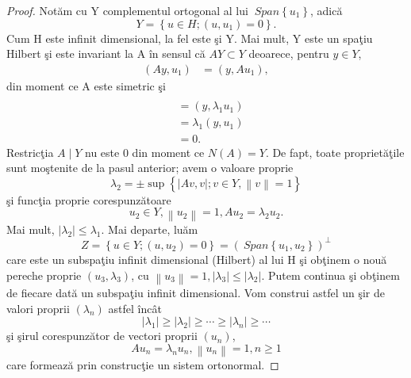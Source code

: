 \documentclass[a4paper,12pt,oneside]{report}
\begin{document}
\begin{proof}
Not\u{a}m cu Y complementul ortogonal al lui \(\ Span \left \{ u_{1} \right \}\), adic\u{a}
\begin{displaymath}
  Y = \left \{ u \in H; \left ( u,u_{1} \right ) = 0  \right \}.
\end{displaymath}
Cum H este infinit dimensional, la fel este \c{s}i Y. Mai mult, Y este un spa\c{t}iu Hilbert \c{s}i este invariant la A \^{i}n sensul c\u{a} \(AY \subset Y\) deoarece, pentru \( y\in Y\),
\begin{equation} \nonumber
    \begin{split}
        \left ( Ay, u_{1} \right ) &  = \left ( y,Au_{1} \right ),
    \end{split}
\end{equation}
din moment ce A este simetric \c{s}i
\begin{equation} \nonumber
\begin{split}
    \\ & = \left ( y,\lambda _{1}u_{1} \right ) \\ & = \lambda _{1}\left ( y,u_{1} \right ) \\ & = 0.
\end{split}
\end{equation}
Restric\c{t}ia \(A\mid Y\) nu este 0 din moment ce \(N\left ( A \right ) = Y\). De fapt, toate propriet\u{a}\c{t}ile sunt mo\c{s}tenite de la pasul anterior; avem o valoare proprie
\begin{displaymath}
  \lambda _{2} = \pm \sup \left \{ \left | Av,v \right | ; v \in Y, \left \| v \right \| = 1\right \}
\end{displaymath}
\c{s}i func\c{t}ia proprie corespunz\u{a}toare
\begin{displaymath}
  u_{2} \in Y ,\left \| u_{2} \right \| = 1, Au_{2} = \lambda _{2}u_{2}.
\end{displaymath}
Mai mult, \(\left | \lambda _{2} \right |\leq \lambda _{1}\).
Mai departe, lu\u{a}m
\begin{displaymath}
  Z = \left \{ u \in Y ; \left ( u,u_{2} \right ) = 0 \right \} = \left ( \ Span\left \{ u_{1}, u_{2} \right \} \right )^{\perp }
\end{displaymath}
care este un subspa\c{t}iu infinit dimensional (Hilbert) al lui H \c{s}i ob\c{t}inem
o nou\u{a} pereche proprie \(\left ( u_{3},\lambda _{3} \right )\), cu \(\left \| u_{3} \right \| = 1, \left | \lambda _{3} \right |\leq \left | \lambda _{2} \right |\). Putem continua \c{s}i ob\c{t}inem de fiecare dat\u{a} un subspa\c{t}iu infinit dimensional. Vom construi astfel un \c{s}ir de valori proprii \(\left ( \lambda _{n} \right )\) astfel \^{i}nc\^{a}t
\begin{displaymath}
  \left | \lambda _{1} \right |\geq \left | \lambda _{2} \right |\geq \cdots \geq \left | \lambda _{n} \right |\geq \cdots \label{eq:1.21} \tag{1.21}
\end{displaymath}
\c{s}i \c{s}irul corespunz\u{a}tor de vectori proprii \(\left ( u_{n} \right )\),
\begin{displaymath}
  Au_{n} = \lambda _{n}u_{n}, \left \| u_{n} \right \| = 1, n\geq 1
\end{displaymath}
care formeaz\u{a} prin construcţie un sistem ortonormal.


\end{proof}
\end{document}
